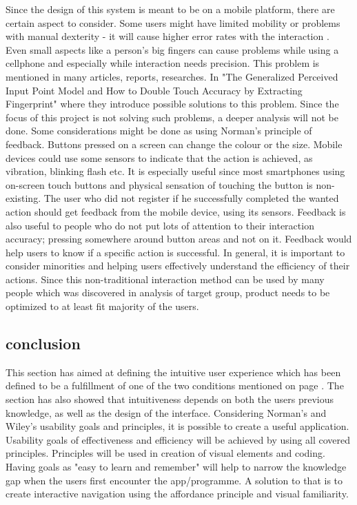 Since the design of this system is meant to be on a mobile platform, there are certain aspect to consider. Some users might have limited mobility or problems with manual dexterity - it will cause higher error rates with the interaction \cite{Wileys}. Even small aspects like a person's big fingers can cause problems while using a cellphone and especially while interaction needs precision. This problem is mentioned in many articles, reports, researches. In "The Generalized Perceived Input Point Model and How to Double Touch Accuracy by Extracting Fingerprint" where they introduce possible solutions to this problem. Since the focus of this project is not solving such problems, a deeper analysis will not be done. Some considerations might be done as using Norman's principle of feedback. Buttons pressed on a screen can change the colour or the size. Mobile devices could use some sensors to indicate that the action is achieved, as vibration, blinking flash etc. It is especially useful since most smartphones using on-screen touch buttons and physical sensation of touching the button is non-existing.  The user who did not register if he successfully completed the wanted action should get feedback from the mobile device, using its sensors. Feedback is also useful to people who do not put lots of attention to their interaction accuracy; pressing somewhere around button areas and not on it. Feedback would help users to know if a specific action is successful. 
In general, it is important to consider minorities and helping users effectively understand the efficiency of their actions. Since this non-traditional interaction method can be used by many people which was discovered in analysis of target group, product needs to be optimized to at least fit majority of the users. 

\subsection{conclusion}
This section has aimed at defining the intuitive user experience which has been defined to be a fulfillment of one of the two conditions mentioned on page \pageref{intuitiveConditions}. The section has also showed that intuitiveness depends on both the users previous knowledge, as well as the design of the interface. Considering Norman's and Wiley's usability goals and principles, it is 
possible to create a useful application. Usability goals of effectiveness and 
efficiency will be achieved by using all covered principles. Principles will be 
used in creation of visual elements and coding. Having goals as "easy to learn and 
remember" will help to narrow the knowledge gap when the users first encounter the app/programme. A solution to that is to create interactive navigation using the
affordance principle and visual familiarity.\label{EvalConUsability}
